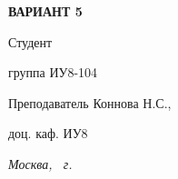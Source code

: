 \vspace{1cm}

\noindent
{\centering\rmfamily\bfseries\fontsize{16pt}{16pt}\selectfont
    ВАРИАНТ 5 \\
}

\vfill

\noindent
{\rmfamily\fontsize{14pt}{14pt}\selectfont Студент} \hfill{}

\hfill {\rmfamily\fontsize{14pt}{14pt}\selectfont группа ИУ8-104}

\vspace{1cm}

\noindent
{\rmfamily\fontsize{14pt}{14pt}\selectfont Преподаватель} \hfill {\rmfamily\fontsize{14pt}{14pt}\selectfont Коннова  Н.С.,}

\hfill {\rmfamily\fontsize{14pt}{14pt}\selectfont доц. каф. ИУ8}


\vspace{2cm}

{\centering\rmfamily\itshape\fontsize{14pt}{14pt}\selectfont Москва, \the\year~г. \par}
\newpage
\pagestyle{plain}
